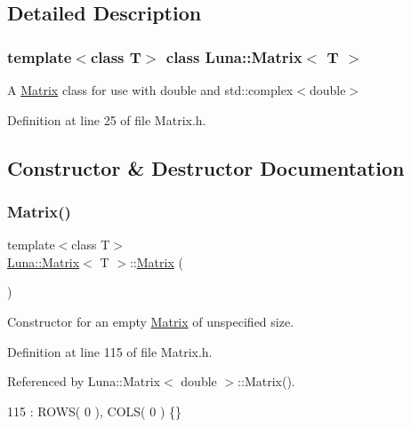 \subsection{Detailed Description}
\subsubsection*{template$<$class T$>$\newline
class Luna\+::\+Matrix$<$ T $>$}

A \hyperlink{classLuna_1_1Matrix}{Matrix} class for use with double and std\+::complex$<$double$>$ 

Definition at line 25 of file Matrix.\+h.



\subsection{Constructor \& Destructor Documentation}
\mbox{\label{classLuna_1_1Matrix_a70f4051bba3f6c58f85bf8a9237673e0}} 
\subsubsection{\texorpdfstring{Matrix()}{Matrix()}\hspace{0.1cm}{\footnotesize\ttfamily [1/3]}}
{\footnotesize\ttfamily template$<$class T$>$ \\
\hyperlink{classLuna_1_1Matrix}{Luna\+::\+Matrix}$<$ T $>$\+::\hyperlink{classLuna_1_1Matrix}{Matrix} (\begin{DoxyParamCaption}{ }\end{DoxyParamCaption})\hspace{0.3cm}{\ttfamily [inline]}}



Constructor for an empty \hyperlink{classLuna_1_1Matrix}{Matrix} of unspecified size. 



Definition at line 115 of file Matrix.\+h.



Referenced by Luna\+::\+Matrix$<$ double $>$\+::\+Matrix().


\begin{DoxyCode}
115 : ROWS( 0 ), COLS( 0 ) \{\}
\end{DoxyCode}
\mbox{\label{classLuna_1_1Matrix_a88325043c4504e0af3bfff5bf3fe0ead}} 
